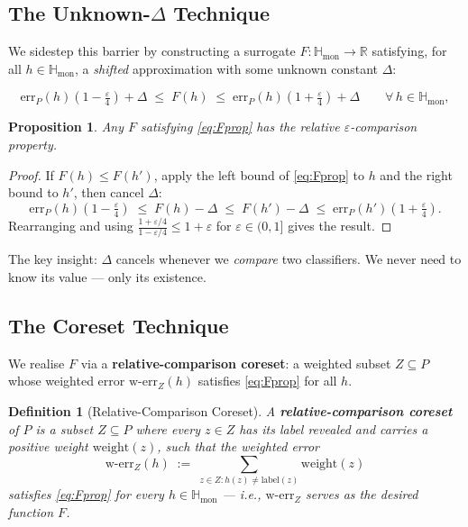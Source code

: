 \documentclass[11pt, a4paper]{article}
\theoremstyle{boxed}
\newtheorem{innerdefinition}{Definition}[section]
\newtheorem{innerproposition}{Proposition}[section]
\newenvironment{definition}
  {\begin{mdframed}[style=defstyle]\begin{innerdefinition}}
  {\end{innerdefinition}\end{mdframed}}
\newenvironment{proposition}
  {\begin{mdframed}[style=propstyle]\begin{innerproposition}}
  {\end{innerproposition}\end{mdframed}}
\newcommand{\R}{\mathbb{R}}
\newcommand{\Hmon}{\mathbb{H}_{\mathrm{mon}}}
\begin{document}
\subsection{The Unknown-$\Delta$ Technique}

We sidestep this barrier by constructing a surrogate $F : \Hmon \to \R$
satisfying, for all $h \in \Hmon$, a \emph{shifted} approximation with
some unknown constant $\Delta$:

\begin{equation}\label{eq:Fprop}
  \mathrm{err}_P(h)\!\left(1 - \tfrac{\varepsilon}{4}\right) + \Delta \;\le\; F(h) \;\le\; \mathrm{err}_P(h)\!\left(1 + \tfrac{\varepsilon}{4}\right) + \Delta \qquad \forall\, h \in \Hmon,
\end{equation}
 
\begin{proposition}\label{prop:Fimplies}
  Any $F$ satisfying \eqref{eq:Fprop} has the relative $\varepsilon$-comparison property.
\end{proposition}
 
\begin{proof}
  If $F(h) \le F(h')$, apply the left bound of \eqref{eq:Fprop} to $h$
  and the right bound to $h'$, then cancel $\Delta$:
  \[
    \mathrm{err}_P(h)\!\left(1 - \tfrac{\varepsilon}{4}\right)
    \;\le\; F(h) - \Delta
    \;\le\; F(h') - \Delta
    \;\le\; \mathrm{err}_P(h')\!\left(1 + \tfrac{\varepsilon}{4}\right).
  \]
  Rearranging and using $\frac{1+\varepsilon/4}{1-\varepsilon/4} \le 1+\varepsilon$
  for $\varepsilon \in (0,1]$ gives the result.
\end{proof}
 
The key insight: $\Delta$ cancels whenever we \emph{compare} two classifiers. We never need to know its value — only its existence.
\subsection{The Coreset Technique}

We realise $F$ via a \textbf{relative-comparison coreset}: a weighted subset $Z \subseteq P$ whose weighted error $\mathrm{w\text{-}err}_Z(h)$ satisfies \eqref{eq:Fprop} for all $h$.
 
\begin{definition}[Relative-Comparison Coreset]
  A \textbf{relative-comparison coreset} of $P$ is a subset $Z \subseteq P$ where every $z \in Z$ has its label revealed and carries a positive weight $\mathrm{weight}(z)$, such that the \emph{weighted error}
  \[
    \mathrm{w\text{-}err}_Z(h) \;:=\; \sum_{z \in Z : h(z) \ne \mathrm{label}(z)} \mathrm{weight}(z)
  \]
  satisfies \eqref{eq:Fprop} for every $h \in \Hmon$ --- i.e., $\mathrm{w\text{-}err}_Z$ serves as the desired function $F$.
\end{definition}
 
\end{document}
